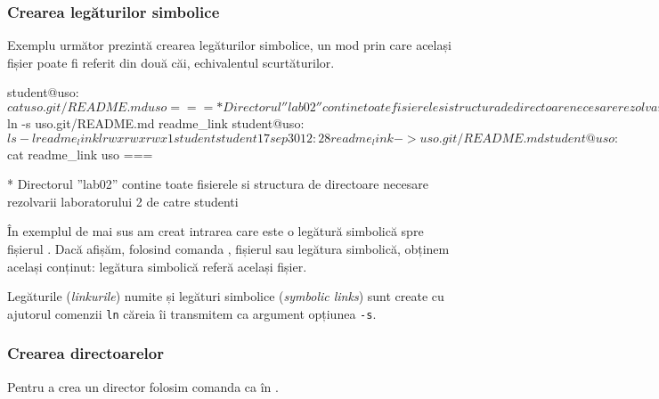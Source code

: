 \subsubsection{Crearea legăturilor simbolice}
\label{sec:fs:link}

Exemplu următor prezintă crearea legăturilor simbolice, un mod prin care același fișier poate fi referit din două căi, echivalentul scurtăturilor.

\begin{screen}
student@uso:~$ cat uso.git/README.md
uso
===

   * Directorul ''lab02'' contine toate fisierele si structura de directoare necesare rezolvarii laboratorului 2 de catre studenti
student@uso:~$ ln -s uso.git/README.md readme_link
student@uso:~$ ls -l readme_link
lrwxrwxrwx 1 student student 17 sep 30 12:28 readme_link -> uso.git/README.md
student@uso:~$ cat readme_link
uso
===

   * Directorul ''lab02'' contine toate fisierele si structura de directoare necesare rezolvarii laboratorului 2 de catre studenti
\end{screen}

În exemplul de mai sus am creat intrarea  care este o legătură simbolică spre fișierul . Dacă afișăm, folosind comanda , fișierul sau legătura simbolică, obținem același conținut: legătura simbolică referă același fișier.

Legăturile (\textit{linkurile}) numite și legături simbolice (\textit{symbolic links}) sunt create cu ajutorul comenzii \texttt{ln} căreia îi transmitem ca argument opțiunea \texttt{-s}.

\subsubsection{Crearea directoarelor}
\label{sec:fs:mkdir}

Pentru a crea un director folosim comanda  ca în .


